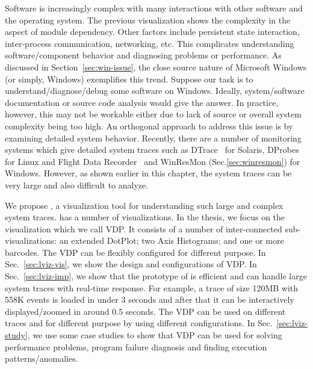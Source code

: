 
Software is increasingly complex with many interactions with other software
and the operating system.
The previous visualization shows the complexity in the
aspect of module dependency.
Other factors include persistent state interaction, inter-process communication,
networking, etc.
This complicates understanding software/component behavior and diagnosing
problems or performance.
As discussed in Section~\ref{sec:win-issue},
the close source nature of Microsoft Windows (or simply, Windows)
exemplifies this trend.
Suppose our task is to understand/diagnose/debug some software on Windows.
Ideally, system/software documentation or source code
analysis would give the answer.
In practice, however, this may not be
workable either due to lack of source or overall
system complexity being too high.
An orthogonal approach to address this issue is by examining
detailed system behavior.
Recently, there are a number of monitoring systems which
give detailed system traces such as DTrace~\cite{cantrill2004dynamic} for Solaris,
DProbes for Linux and Flight Data Recorder~\cite{verbowski6flight}
and WinResMon (Sec.\ref{sec:winresmon}) for Windows.
However, as shown earlier in this chapter,
the system traces can be very large and also
difficult to analyze.

We propose , a visualization tool for
understanding such large and complex system traces.
 has a number of visualizations.
In the thesis, we focus on the visualization which we call VDP.
It consists of a number of inter-connected sub-visualizations:
an extended DotPlot;
two Axis Histograms; and one or more barcodes.
The VDP can be flexibly configured for different purpose.
In Sec.~\ref{sec:lviz-vis}, we show the design and configurations of VDP.
In Sec.~\ref{sec:lviz-imp}, we show that
the prototype of  is efficient and can handle large system traces
with real-time response. For example, a trace of size 120MB with 558K events 
is loaded in under 3 seconds
and after that it can be interactively displayed/zoomed in around 0.5 seconds.
The VDP can be used on different traces and for different purpose
by using different configurations.
In Sec.~\ref{sec:lviz-study}, we use some case studies to show that
VDP can be used for solving performance problems,
program failure diagnosis and finding execution patterns/anomalies.
